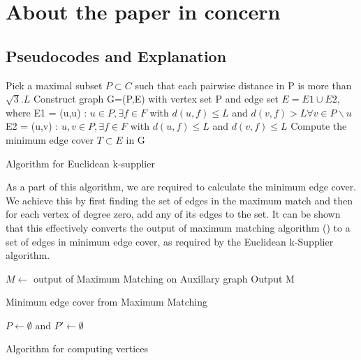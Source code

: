 \documentclass[12pt, a4paper]{article}
\begin{document}
\section{About the paper in concern}

\subsection{Pseudocodes and Explanation}
\begin{algorithm}[H]
 Pick a maximal subset $P \subset C$ such that each pairwise distance in P is more than $\sqrt{3}.L$\;
 Construct graph G=(P,E) with vertex set P and edge set $E = E1 \cup E2$, where \newline
 E1 =  {(u,u) : $ u \in P, \exists f \in F $ with $d(u,f) \leq L$ and $d(v,f) > L \forall v \in P\backslash u$}\;
 E2 =  {(u,v) : $u,v \in P, \exists f \in F$ with $d(u,f) \leq L$ and $d(v,f) \leq L$}\;
 Compute the minimum edge cover $T \subset E$ in G\;
 \caption{Algorithm for Euclidean k-supplier\newline}
 \end{algorithm}

As a part of this algorithm, we are required to calculate the minimum edge cover. We achieve this by first finding the set of edges in the maximum match and then for each vertex of degree zero, add any of its edges to the set. It can be shown that this effectively converts the output of maximum matching algorithm (\cite{MicaliVazirani}) to a set of edges in minimum edge cover, as required by the Euclidean k-Supplier algorithm.\\

\begin{algorithm}[H]
$M \gets$ output of Maximum Matching on Auxillary graph\;
 Output M\;
 \caption{Minimum edge cover from Maximum Matching\newline}
 \end{algorithm}
\begin{algorithm}[H]
 $P \gets \emptyset$ and $ P' \gets \emptyset$ \;
\caption{Algorithm for computing vertices\newline\newline}
\end{algorithm}
\end{document}
